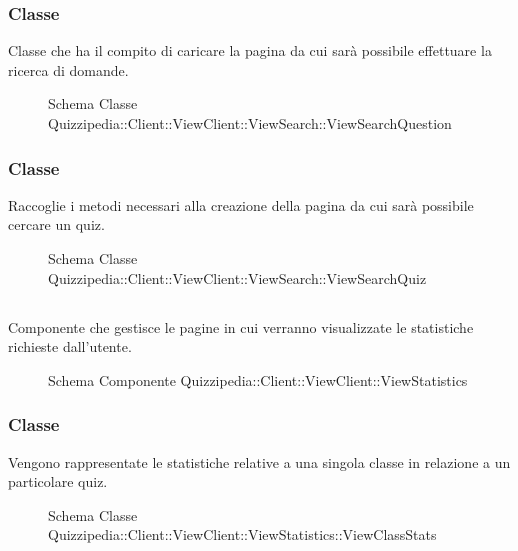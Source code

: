 \subsubsection{Classe }
Classe che ha il compito di caricare la pagina da cui sarà possibile effettuare la ricerca di domande.
\begin{figure}[H]
\centering
\noindent{}
\caption[Schema Classe ViewSearchQuestion]{Schema Classe Quizzipedia::Client::ViewClient::ViewSearch::ViewSearchQuestion}
\end{figure}
\subsubsection{Classe }
Raccoglie i metodi necessari alla creazione della pagina da cui sarà possibile cercare un quiz.
\begin{figure}[H]
\centering
\noindent{}
\caption[Schema Classe ViewSearchQuiz]{Schema Classe Quizzipedia::Client::ViewClient::ViewSearch::ViewSearchQuiz}
\end{figure}
\subsection{}
Componente che gestisce le pagine in cui verranno visualizzate le statistiche richieste dall'utente.
\begin{figure}[H]
\centering
\noindent{}
\caption[Schema Componente Quizzipedia::Client::ViewClient::ViewStatistics]{Schema Componente Quizzipedia::Client::ViewClient::ViewStatistics}
\end{figure}
\subsubsection{Classe }
Vengono rappresentate le statistiche relative a una singola classe in relazione a un particolare quiz.
\begin{figure}[H]
\centering
\noindent{}
\caption[Schema Classe ViewClassStats]{Schema Classe Quizzipedia::Client::ViewClient::ViewStatistics::ViewClassStats}
\end{figure}
